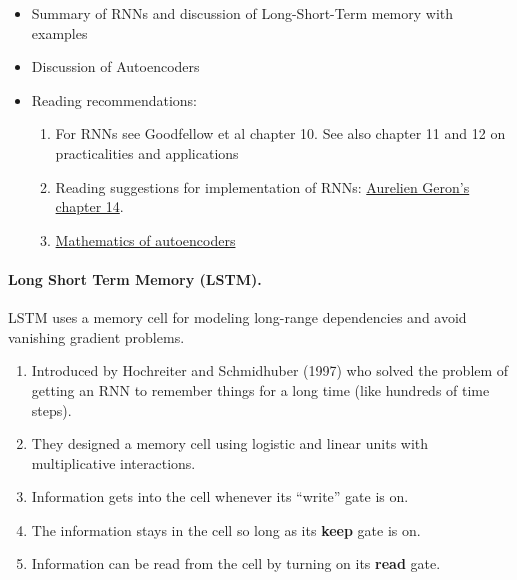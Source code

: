 \documentclass[%
oneside,                 %
final,                   %
10pt]{article}
\begin{document}
\begin{itemize}
\item Summary of RNNs and discussion of Long-Short-Term memory with examples

\item Discussion of Autoencoders

\item Reading recommendations:
\begin{enumerate}

 \item For RNNs see Goodfellow et al chapter 10. See also chapter 11 and 12 on practicalities and applications

 \item Reading suggestions for implementation of RNNs: \href{{https://github.com/CompPhysics/MachineLearning/blob/master/doc/Textbooks/TensorflowML.pdf}}{Aurelien Geron's chapter 14}. 

 \item \href{{https://arxiv.org/abs/2201.03898}}{Mathematics of autoencoders}
\end{enumerate}

\noindent
\end{itemize}

\noindent



\paragraph{Long Short Term Memory (LSTM).}
LSTM uses a memory cell for 
 modeling long-range dependencies and avoid vanishing gradient
 problems.

\begin{enumerate}
\item Introduced by Hochreiter and Schmidhuber (1997) who solved the problem of getting an RNN to remember things for a long time (like hundreds of time steps).

\item They designed a memory cell using logistic and linear units with multiplicative interactions.

\item Information gets into the cell whenever its “write” gate is on.

\item The information stays in the cell so long as its \textbf{keep} gate is on.

\item Information can be read from the cell by turning on its \textbf{read} gate. 
\end{enumerate}
\end{document}
